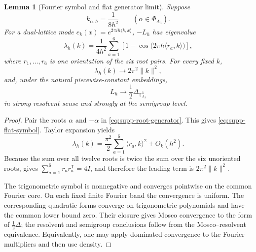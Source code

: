 \documentclass[11pt]{article}
\numberwithin{equation}{section}
\newtheorem{lemma}[lemma]{Lemma}
\theoremstyle{definition}
\theoremstyle{remark}
\newcommand{\norm}[1]{\lVert#1\rVert}
\begin{document}
\begin{lemma}[Fourier symbol and flat generator limit]
\label{lem:supp-flat-symbol}
Suppose
\begin{equation}
 k_{\alpha,h}=\frac1{8h^2}
 \qquad(\alpha\in\Phi_{A_3}).
 \label{eq:supp-flat-rates}
\end{equation}
For a dual-lattice mode $e_k(x)=e^{2\pi i h\langle k,x\rangle}$,
$-L_h$ has eigenvalue
\begin{equation}
 \lambda_h(k)
 =\frac1{4h^2}\sum_{a=1}^{6}
  \left[1-\cos\bigl(2\pi h\langle r_a,k\rangle\bigr)\right],
 \label{eq:supp-flat-symbol}
\end{equation}
where $r_1,\ldots,r_6$ is one orientation of the six root pairs.  For every
fixed $k$,
\begin{equation}
 \lambda_h(k)\longrightarrow2\pi^2\norm{k}^2,
 \label{eq:supp-flat-symbol-limit}
\end{equation}
and, under the natural piecewise-constant embeddings,
\begin{equation}
 L_h\longrightarrow\frac12\Delta_{\mathbb T^3_{A_3}}
 \label{eq:supp-flat-generator-limit}
\end{equation}
in strong resolvent sense and strongly at the semigroup level.
\end{lemma}

\begin{proof}
Pair the roots $\alpha$ and $-\alpha$ in
\eqref{eq:supp-root-generator}.  This gives
\eqref{eq:supp-flat-symbol}.  Taylor expansion yields
\[
 \lambda_h(k)
 =\frac{\pi^2}{2}\sum_{a=1}^6\langle r_a,k\rangle^2+O_k(h^2).
\]
Because the sum over all twelve roots is twice the sum over the six unoriented
roots,  gives
$\sum_{a=1}^6r_ar_a^{\mathsf T}=4I$, and therefore the leading term is
$2\pi^2\norm{k}^2$.

The trigonometric symbol is nonnegative and converges pointwise on the common
Fourier core.  On each fixed finite Fourier band the convergence is uniform.
The corresponding quadratic forms converge on trigonometric polynomials and
have the common lower bound zero.  Their closure gives Mosco convergence to
the form of $\tfrac12\Delta$; the resolvent and semigroup conclusions follow
from the Mosco--resolvent equivalence.  Equivalently, one may apply dominated
convergence to the Fourier multipliers and then use density.
\end{proof}
\end{document}
